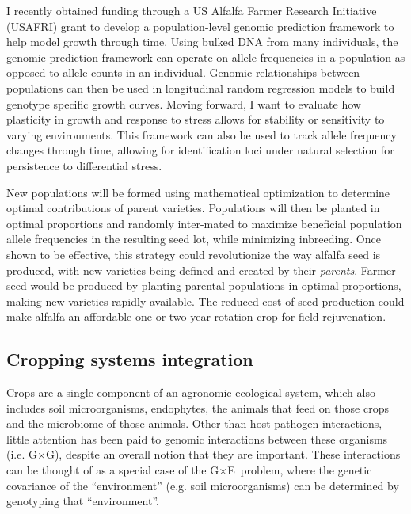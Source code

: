 \documentclass[11pt]{article}
\newcommand{\gxe}{G$\times$E}
\newcommand{\gxg}{G$\times$G}
\begin{document}
I recently obtained funding through a US Alfalfa Farmer Research Initiative (USAFRI) grant to develop a population-level genomic prediction framework to help model growth through time. Using bulked DNA from many individuals, the genomic prediction framework can operate on allele frequencies in a population as opposed to allele counts in an individual. Genomic relationships between populations can then be used in longitudinal random regression models to build genotype specific growth curves. Moving forward, I want to evaluate how plasticity in growth and response to stress allows for stability or sensitivity to varying environments. This framework can also be used to track allele frequency changes through time, allowing for identification loci under natural selection for persistence to differential stress.%


New populations will be formed using mathematical optimization to determine optimal contributions of parent varieties. Populations will then be planted in optimal proportions and randomly inter-mated to maximize beneficial population allele frequencies in the resulting seed lot, while minimizing inbreeding. Once shown to be effective, this strategy could revolutionize the way alfalfa seed is produced, with new varieties being defined and created by their \emph{parents}. Farmer seed would be produced by planting parental populations in optimal proportions, making new varieties rapidly available. The reduced cost of seed production could make alfalfa an affordable one or two year rotation crop for field rejuvenation.


\subsection*{Cropping systems integration}

Crops are a single component of an agronomic ecological system, which also includes soil microorganisms, endophytes, the animals that feed on those crops and the microbiome of those animals. Other than host-pathogen interactions, little attention has been paid to genomic interactions between these organisms (i.e. \gxg), despite an overall notion that they are important. These interactions can be thought of as a special case of the \gxe\ problem, where the genetic covariance of the ``environment'' (e.g. soil microorganisms) can be determined by genotyping that ``environment''. 
\end{document}
